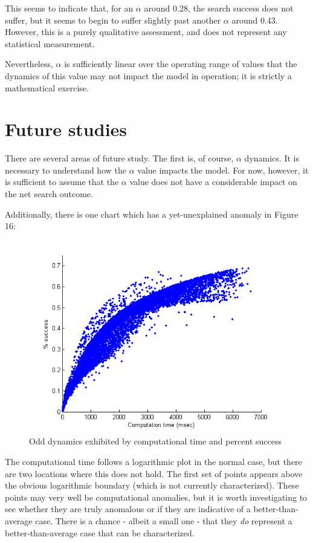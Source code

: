 \documentclass[a4paper]{article}
\begin{document}
This seems to indicate that, for an $\alpha$ around 0.28, the search success does not suffer, but it seems to begin to suffer slightly past another $\alpha$ around 0.43. However, this is a purely qualitative assessment, and does not represent any statistical measurement.

Nevertheless, $\alpha$ is sufficiently linear over the operating range of values that the dynamics of this value may not impact the model in operation; it is strictly a mathematical exercise.

\section{Future studies}

There are several areas of future study. The first is, of course, $\alpha$ dynamics. It is necessary to understand how the $\alpha$ value impacts the model. For now, however, it is sufficient to assume that the $\alpha$ value does not have a considerable impact on the net search outcome. 

Additionally, there is one chart which has a yet-unexplained anomaly in Figure 16:

\begin{figure}[H]\begin{center}
\includegraphics[scale=0.75]{../Matlab/Images/CompTimePctSuccess.png}
\caption{Odd dynamics exhibited by computational time and percent success}
\end{center}\end{figure}

The computational time follows a logarithmic plot in the normal case, but there are two locations where this does not hold. The first set of points appears above the obvious logarithmic boundary (which is not currently characterized). These points may very well be computational anomalies, but it is worth investigating to see whether they are truly anomalous or if they are indicative of a better-than-average case. There is a chance - albeit a small one - that they \textit{do} represent a better-than-average case that can be characterized. 
\end{document}
